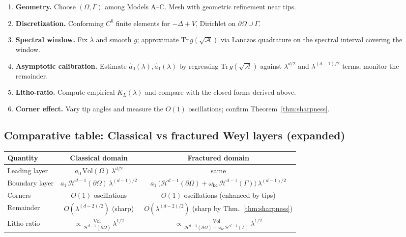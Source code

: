 \begin{enumerate}[label=\textbf{N\arabic*.}]
\item \textbf{Geometry.} Choose $(\Omega,\Gamma)$ among Models A--C. Mesh with geometric refinement near tips.
\item \textbf{Discretization.} Conforming $C^0$ finite elements for $-\Delta+V$, Dirichlet on $\partial\Omega\cup\Gamma$.
\item \textbf{Spectral window.} Fix $\lambda$ and smooth $g$; approximate $\mathrm{Tr}\,g(\sqrt{\mathcal{A}})$
via Lanczos quadrature on the spectral interval covering the window.
\item \textbf{Asymptotic calibration.} Estimate
$\widehat a_0(\lambda),\widehat a_1(\lambda)$ by regressing
$\mathrm{Tr}\,g(\sqrt{\mathcal{A}})$ against $\lambda^{d/2}$ and $\lambda^{(d-1)/2}$ terms, monitor the remainder.
\item \textbf{Litho-ratio.} Compute empirical $K_L(\lambda)$ and compare with the closed forms derived above.
\item \textbf{Corner effect.} Vary tip angles and measure the $O(1)$ oscillations; confirm Theorem~\ref{thm:sharpness}.
\end{enumerate}

\subsection*{Comparative table: Classical vs fractured Weyl layers (expanded)}
\begin{center}
\renewcommand{\arraystretch}{1.2}
\begin{tabular}{|l|c|c|}
\hline
Quantity & Classical domain & Fractured domain \\ \hline
Leading layer & $a_0\,\mathrm{Vol}(\Omega)\,\lambda^{d/2}$ & same \\ \hline
Boundary layer & $a_1\,\mathcal{H}^{d-1}(\partial\Omega)\,\lambda^{(d-1)/2}$ &
$a_1\,\big(\mathcal{H}^{d-1}(\partial\Omega)+\omega_{\mathsf{bc}}\,\mathcal{H}^{d-1}(\Gamma)\big)\,\lambda^{(d-1)/2}$ \\ \hline
Corners & $O(1)$ oscillations & $O(1)$ oscillations (enhanced by tips) \\ \hline
Remainder & $O(\lambda^{(d-2)/2})$ (sharp) & $O(\lambda^{(d-2)/2})$ (sharp by Thm.~\ref{thm:sharpness}) \\ \hline
Litho-ratio & $\propto \frac{\mathrm{Vol}}{\mathcal{H}^{d-1}(\partial\Omega)}\,\lambda^{1/2}$ &
$\propto \frac{\mathrm{Vol}}{\mathcal{H}^{d-1}(\partial\Omega)+\omega_{\mathsf{bc}}\mathcal{H}^{d-1}(\Gamma)}\,\lambda^{1/2}$ \\ \hline
\end{tabular}
\end{center}

